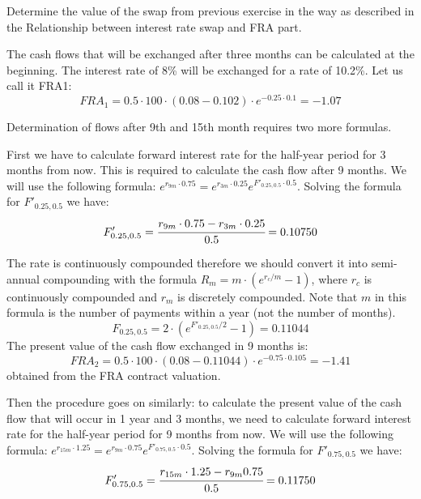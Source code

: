 \documentclass[12pt,a4paper]{book}
\begin{document}
\begin{exercise}[subtitle=Interest Rate Swap]
Determine the value of the swap from previous exercise in the way as described in the Relationship between interest rate swap and FRA part.
\end{exercise}
\begin{solution}
The cash flows that will be exchanged after three months can be calculated at the beginning. The interest rate of 8\% will be exchanged for a rate of 10.2\%. Let us call it FRA1:
\begin{equation*}
FRA_1 = 0.5\cdot 100\cdot (0.08-0.102)\cdot e^{-0.25\cdot 0.1}=-1.07
\end{equation*}

Determination of flows after 9th and 15th month requires two more formulas.

First we have to calculate forward interest rate for the half-year period for 3 months from now. This is required to calculate the cash flow after 9 months. We will use the following formula: $e^{r_{9m}\cdot0.75}=e^{r_{3m}\cdot0.25}e^{F'_{0.25, 0.5}\cdot 0.5}$. Solving the formula for $F'_{0.25, 0.5}$ we have:
\begin{equation*}
F'_{0.25, 0.5}=\cfrac{r_{9m}\cdot 0.75-r_{3m}\cdot0.25}{0.5}=0.10750
\end{equation*}

The rate is continuously compounded therefore we should convert it into semi-annual compounding with the formula $R_m = m\cdot(e^{r_c/m}-1)$, where $r_c$ is continuously compounded and $r_m$ is discretely compounded. Note that $m$ in this formula is the number of payments within a year (not the number of months).
\begin{equation*}
F_{0.25, 0.5}=2\cdot(e^{F'_{0.25,0.5}/2}-1)=0.11044
\end{equation*}
The present value of the cash flow exchanged in 9 months is:
\begin{equation*}
FRA_2=0.5\cdot100\cdot(0.08-0.11044)\cdot e^{-0.75\cdot0.105}=-1.41
\end{equation*}
obtained from the FRA contract valuation.

Then the procedure goes on similarly: to calculate the present value of the cash flow that will occur in 1 year and 3 months, we need to calculate forward interest rate for the half-year period for 9 months from now. We will use the following formula: $e^{r_{15m}\cdot 1.25}=e^{r_{9m}\cdot 0.75}e^{F'_{0.75, 0.5}\cdot 0.5}$. Solving the formula for $F'_{0.75, 0.5}$
 we have:
\begin{equation*}
F'_{0.75, 0.5}=\cfrac{r_{15m}\cdot1.25-r_{9m}0.75}{0.5}=0.11750
\end{equation*}


\end{solution}
\end{document}
